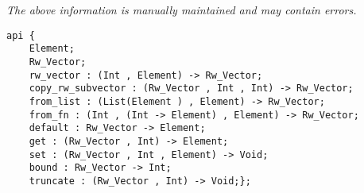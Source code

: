 \label{api:Typelocked\_Expanding\_Rw\_Vector}

{\tiny \it The above information is manually maintained and may contain errors.}
\begin{verbatim}
api {
    Element;
    Rw_Vector;
    rw_vector : (Int , Element) -> Rw_Vector;
    copy_rw_subvector : (Rw_Vector , Int , Int) -> Rw_Vector;
    from_list : (List(Element ) , Element) -> Rw_Vector;
    from_fn : (Int , (Int -> Element) , Element) -> Rw_Vector;
    default : Rw_Vector -> Element;
    get : (Rw_Vector , Int) -> Element;
    set : (Rw_Vector , Int , Element) -> Void;
    bound : Rw_Vector -> Int;
    truncate : (Rw_Vector , Int) -> Void;};
\end{verbatim}
